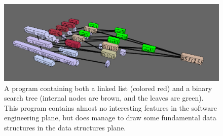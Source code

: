 \documentclass[11pt]{article}
\begin{document}
\begin{figure}
\begin{center}
\includegraphics[width=5in]{figures/basic.png}
\end{center}
\caption{A program containing both a linked list (colored red) and a binary
search tree (internal nodes are brown, and the leaves are green).  This program
contains almost no interesting features in the software engineering plane, but
does manage to draw some fundamental data structures in the data structures
plane.}
\label{fig:basic}
\end{figure}
\end{document}
